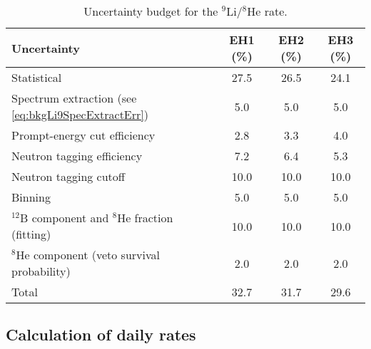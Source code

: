 \documentclass[../thesis.tex]{subfiles}
\begin{document}
\begin{table}[ht]
  \begin{tabular}{lccc}
    \toprule
    Uncertainty & EH1 (\%)& EH2 (\%) & EH3 (\%) \\
    \midrule
    Statistical & 27.5 & 26.5 & 24.1 \\
    Spectrum extraction (see \autoref{eq:bkgLi9SpecExtractErr}) & 5.0 & 5.0 & 5.0 \\
    Prompt-energy cut efficiency & 2.8 & 3.3 & 4.0 \\
    Neutron tagging efficiency & 7.2 & 6.4 & 5.3 \\
    Neutron tagging cutoff & 10.0 & 10.0 & 10.0 \\
    Binning & 5.0 & 5.0 & 5.0 \\
    $^{12}$B component and $^8$He fraction (fitting) & 10.0 & 10.0 & 10.0  \\
    $^8$He component (veto survival probability) & 2.0 & 2.0 & 2.0 \\
    \midrule
    Total & 32.7 & 31.7 & 29.6 \\
    \bottomrule
  \end{tabular}
  \caption{Uncertainty budget for the $^9$Li/$^8$He rate.}
  \label{tab:bkgLi9UncSumm}
\end{table}

\subsection{Calculation of daily rates}
\label{sec:bkgLi9DailyRateCalc}
\end{document}
